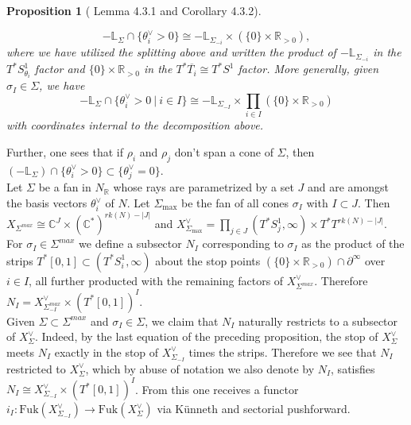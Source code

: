 \documentclass[11pt]{amsart}
\newtheorem{prop}[thm]{Proposition}
\theoremstyle{definition}
\theoremstyle{remark}
\newcommand{\Fuk}{\mathrm{Fuk}}
\numberwithin{equation}{section}
\begin{document}
\begin{prop}[\cite{gammage2022mirror} Lemma 4.3.1 and Corollary 4.3.2]\label{toric ends}

$$-\mathbb{L}_\Sigma \cap \{\theta_i^\vee > 0\} \cong -\mathbb{L}_{\Sigma_{-i}} \times (\{0\}\times\mathbb R_{>0}),$$ where we have utilized the splitting above and written the product of $-\mathbb{L}_{\Sigma_{-i}}$ in the $T^* S^1_{\theta_i}$ factor and $\{0\}\times\mathbb R_{>0}$ in the $T^* \overline{T_i} \cong T^* S^1$ factor. More generally, given $\sigma_I \in \Sigma$, we have $$-\mathbb{L}_\Sigma \cap \{\theta_i^\vee > 0\:|\:i \in I\} \cong -\mathbb{L}_{\Sigma_{-I}} \times \prod_{i \in I} (\{0\}\times\mathbb R_{>0})$$ \noindent with coordinates internal to the decomposition above.
\end{prop}

Further, one sees that if $\rho_i$ and $\rho_j$ don't span a cone of $\Sigma$, then $(-\mathbb{L}_\Sigma)\cap\{\theta_i^\vee>0\}\subset\{\theta_j^\vee=0\}$.\\

Let $\Sigma$ be a fan in $N_{\mathbb R}$ whose rays are parametrized by a set $J$ and are amongst the basis vectors $\theta_i^\vee$ of $N$. Let $\Sigma_{\max}$ be the fan of all cones $\sigma_I$ with $I\subset J$. Then $X_{\Sigma^{max}} \cong \mathbb C^{J}\times(\mathbb C^*)^{rk(N) - |J|}$ and $X^\vee_{\Sigma_{\max}}=\prod_{j\in J}(T^*S^1_j, \infty)\times T^*T^{rk(N) - |J|}$. For $\sigma_I\in\Sigma^{max}$ we define a subsector $N_I$ corresponding to $\sigma_I$ as the product of the strips $T^*[0,1]\subset(T^*S^1_i,\infty)$ about the stop points $(\{0\}\times\mathbb R_{>0}) \cap \partial^\infty$ over $i \in I$, all further producted with the remaining factors of $X^\vee_{\Sigma^{max}}$. Therefore $N_I=X^\vee_{\Sigma_{-I}^{max}}\times(T^*[0,1])^I$.\\

Given $\Sigma \subset \Sigma^{max}$ and $\sigma_I \in \Sigma$, we claim that $N_I$ naturally restricts to a subsector of $X_\Sigma^\vee$. Indeed, by the last equation of the preceding proposition, the stop of $X^\vee_\Sigma$ meets $N_I$ exactly in the stop of $X^\vee_{\Sigma_{-I}}$ times the strips. Therefore we see that $N_I$ restricted to $X_\Sigma^\vee$, which by abuse of notation we also denote by $N_I$, satisfies $N_I\cong X^\vee_{\Sigma_{-I}}\times(T^*[0,1])^I$. From this one receives a functor $i_I \colon \Fuk(X_{\Sigma_{-I}}^\vee) \to \Fuk(X^\vee_\Sigma)$ via K\"{u}nneth and sectorial pushforward.\\
\end{document}
